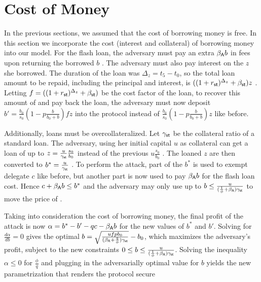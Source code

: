 
\section{Cost of Money}\label{sec:cost-of-money}

In the previous sections, we assumed that the cost of borrowing money is free.
In this section we incorporate the cost (interest and collateral) of borrowing money into our model.
For the flash loan, the adversary must pay an extra
$\beta_{\textsf{A}} b$ \asset in fees upon returning the borrowed $b$ \asset.
The adversary must also pay interest on the $z$ \stasset she borrowed.
The duration of the loan was $\Delta_z = t_5 - t_0$, so the
total loan amount to be repaid, including the principal and interest, is
$((1 + r_{\textsf{st}})^{\Delta_z} + \beta_{\textsf{st}}) z$ \stasset.
Letting $f = ((1 + r_{\textsf{st}})^{\Delta_z} + \beta_{\textsf{st}})$ be the cost factor
of the loan, to recover this amount of \stasset and pay back the loan, the adversary must now
deposit $b' = \frac{b_0}{s_0}(1 - p\frac{b}{b_0 + b}) f z$ \asset
into the protocol instead of $\frac{b_0}{s_0}(1 - p\frac{b}{b_0 + b}) z$ \asset like before.

Additionally, loans must be overcollateralized.
Let $\gamma_{\textsf{st}}$ be the collateral ratio of a standard \stasset loan.
The adversary, using her initial capital $u$ as collateral can get a loan of
up to $z = \frac{u}{\gamma_{\textsf{st}}} \frac{s_0}{b_0}$ \stasset
instead of the previous $u \frac{s_0}{b_0}$ \stasset.
The loaned $z$ \stasset are then converted to $b^*=\frac{u}{\gamma_{\textsf{st}}}$ \asset.
To perform the attack, part of the $b^*$ \asset is used to exempt delegate $c$ like
before, but another part is now used to pay $\beta_{\textsf{A}} b$ for the flash loan cost.
Hence $c + \beta_{\textsf{A}} b \leq b^*$ and the adversary may only use up to
$b \leq \frac{u}{(\frac{1}{\phi} + \beta_{\textsf{A}}) \gamma_{\textsf{st}}}$ to move the price
of \stasset.


Taking into consideration the cost of borrowing money, the final profit of the attack is now
$\alpha = b^* - b' - qc - \beta_{\textsf{A}} b$ for the new values of $b^*$ and $b'$.
Solving for $\frac{d\alpha}{db} = 0$ gives the optimal
$b = \sqrt{\frac{u f p b_0}{(\beta_{\textsf{A}} + \frac{q}{\phi})\gamma_{\textsf{st}}}} - b_0$,
which maximizes the adversary's profit, subject to the new constraints
$0 \leq b \leq \frac{u}{(\frac{1}{\phi} + \beta_{\textsf{A}}) \gamma_{\textsf{st}}}$.
Solving the inequality $\alpha \leq 0$ for $\frac{\phi}{q}$ and plugging in the adversarially optimal value for $b$
yields the new parametrization that renders the protocol secure

